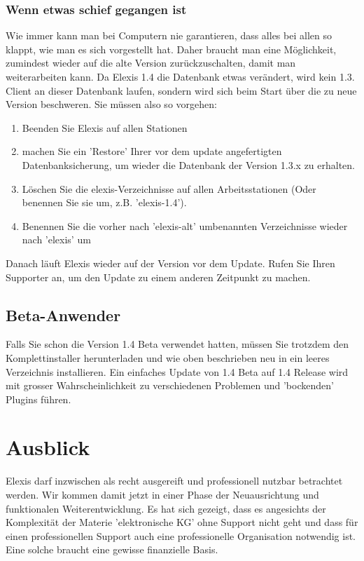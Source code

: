\documentclass[a4paper]{scrartcl}
\begin{document}
\subsubsection{Wenn etwas schief gegangen ist}
Wie immer kann man bei Computern nie garantieren, dass alles bei allen so klappt, wie man es sich vorgestellt hat. Daher braucht man eine Möglichkeit, zumindest wieder auf die alte Version zurückzuschalten, damit man weiterarbeiten kann. Da Elexis 1.4 die Datenbank etwas verändert, wird kein 1.3. Client an dieser Datenbank laufen, sondern wird sich beim Start über die zu neue Version beschweren. Sie müssen also so vorgehen:
\begin{enumerate}
\item Beenden Sie Elexis auf allen Stationen
\item machen Sie ein 'Restore' Ihrer vor dem update angefertigten Datenbanksicherung, um wieder die Datenbank der Version 1.3.x zu erhalten.
\item Löschen Sie die elexis-Verzeichnisse auf allen Arbeitsstationen (Oder benennen Sie sie um, z.B. 'elexis-1.4').
\item Benennen Sie die vorher nach 'elexis-alt' umbenannten Verzeichnisse wieder nach 'elexis' um

\end{enumerate}
Danach läuft Elexis wieder auf der Version vor dem Update. Rufen Sie Ihren Supporter an, um den Update zu einem anderen Zeitpunkt zu machen.

\subsection{Beta-Anwender}
Falls Sie schon die Version 1.4 Beta verwendet hatten, müssen Sie trotzdem den Komplettinstaller herunterladen und wie oben beschrieben neu in ein leeres Verzeichnis installieren. Ein einfaches Update von 1.4 Beta auf 1.4 Release wird mit grosser Wahrscheinlichkeit zu verschiedenen Problemen und 'bockenden' Plugins  führen.

\section{Ausblick}
Elexis darf inzwischen als recht ausgereift und professionell nutzbar betrachtet werden. Wir kommen damit jetzt in einer Phase der Neuausrichtung und funktionalen Weiterentwicklung. Es hat sich gezeigt, dass es angesichts der Komplexität der Materie 'elektronische KG' ohne Support nicht geht und dass für einen professionellen Support auch eine professionelle Organisation notwendig ist. Eine solche braucht eine gewisse finanzielle Basis.
\end{document}
